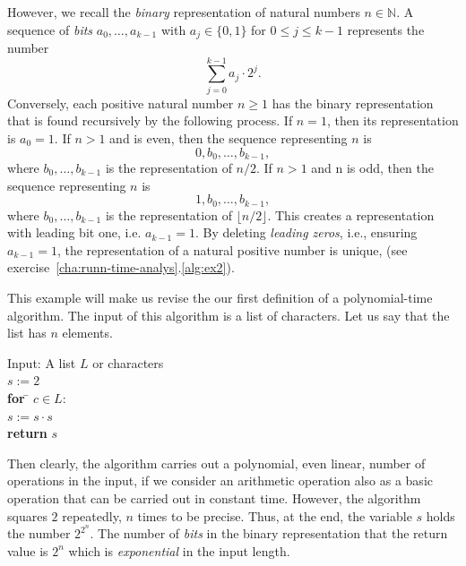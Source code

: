 However, we recall the \emph{binary} representation of natural numbers $n ∈ ℕ$. A sequence of \emph{bits} $a_0,\dots,a_{k-1}$ with $a_j ∈ \{0,1\}$ for $0 ≤j≤k-1$ represents the number 
\begin{displaymath}
  ∑_{j=0}^{k-1} a_j ⋅ 2^j. 
\end{displaymath}  
Conversely, each positive natural number $n≥1$ has the binary representation that is found recursively by the following process. 
If $n=1$, then its representation is $a_0 = 1$. 
If $n>1$ and  is even, then the sequence representing $n$ is 
\begin{displaymath}
  0,b_0,\dots,b_{k-1},
\end{displaymath}
where $b_0,\dots,b_{k-1}$ is the representation of $n/2$. If $n>1$ and n is odd, then the sequence representing $n$ is 
\begin{displaymath}
  1,b_0,\dots,b_{k-1},
\end{displaymath}
where $b_0,\dots,b_{k-1}$ is the representation of $⌊n/2⌋$. This creates a representation with leading bit one, i.e. $a_{k-1}=1$. 
By deleting \emph{leading zeros}, i.e., ensuring $a_{k-1}=1$, the representation of a natural positive number is unique, (see exercise~\ref{cha:runn-time-analys}.\ref{alg:ex2}). 



\begin{example}
  This example will make us revise the our first definition of a polynomial-time algorithm. 
The input of this algorithm is a list of characters. Let us say that the list has $n$ elements. 
 
 \label{ex-a-3}
  \begin{tabbing}
    Input: A list $L$ or characters \\
    $s :=2$ \\
    {\bf for} \= $c ∈ L$:\\
              \> $s:= s ⋅ s$ \\
    {\bf return} $s$         
  \end{tabbing}
  Then clearly, the algorithm carries out a polynomial, even linear,
  number of operations in the input, if we consider an arithmetic
  operation also as a basic operation that can be carried out in
  constant time. However, the algorithm squares $2$
  repeatedly, $n$
  times to be precise. Thus, at the end, the variable $s$
  holds the number $2^{2^n}$.
  The number of \emph{bits} in the binary representation  that the return value
  is $2^n$
  which is \emph{exponential} in the input length. 
\end{example}

